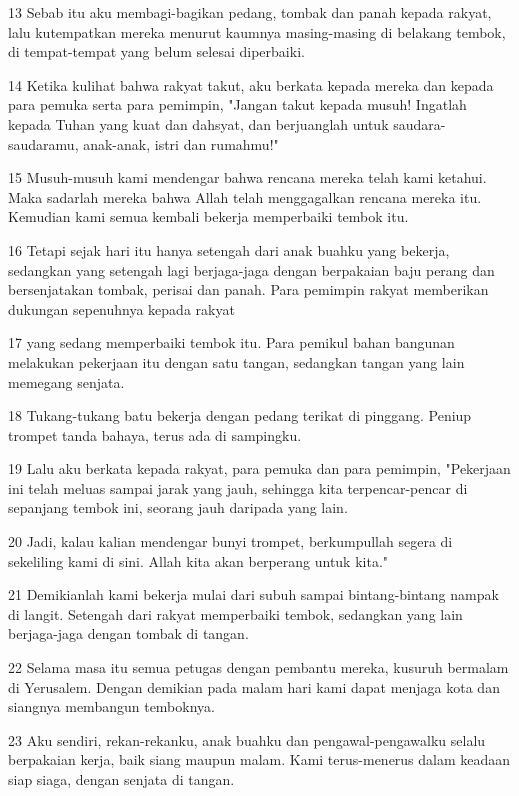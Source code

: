 \par 13 Sebab itu aku membagi-bagikan pedang, tombak dan panah kepada rakyat, lalu kutempatkan mereka menurut kaumnya masing-masing di belakang tembok, di tempat-tempat yang belum selesai diperbaiki.
\par 14 Ketika kulihat bahwa rakyat takut, aku berkata kepada mereka dan kepada para pemuka serta para pemimpin, "Jangan takut kepada musuh! Ingatlah kepada Tuhan yang kuat dan dahsyat, dan berjuanglah untuk saudara-saudaramu, anak-anak, istri dan rumahmu!"
\par 15 Musuh-musuh kami mendengar bahwa rencana mereka telah kami ketahui. Maka sadarlah mereka bahwa Allah telah menggagalkan rencana mereka itu. Kemudian kami semua kembali bekerja memperbaiki tembok itu.
\par 16 Tetapi sejak hari itu hanya setengah dari anak buahku yang bekerja, sedangkan yang setengah lagi berjaga-jaga dengan berpakaian baju perang dan bersenjatakan tombak, perisai dan panah. Para pemimpin rakyat memberikan dukungan sepenuhnya kepada rakyat
\par 17 yang sedang memperbaiki tembok itu. Para pemikul bahan bangunan melakukan pekerjaan itu dengan satu tangan, sedangkan tangan yang lain memegang senjata.
\par 18 Tukang-tukang batu bekerja dengan pedang terikat di pinggang. Peniup trompet tanda bahaya, terus ada di sampingku.
\par 19 Lalu aku berkata kepada rakyat, para pemuka dan para pemimpin, "Pekerjaan ini telah meluas sampai jarak yang jauh, sehingga kita terpencar-pencar di sepanjang tembok ini, seorang jauh daripada yang lain.
\par 20 Jadi, kalau kalian mendengar bunyi trompet, berkumpullah segera di sekeliling kami di sini. Allah kita akan berperang untuk kita."
\par 21 Demikianlah kami bekerja mulai dari subuh sampai bintang-bintang nampak di langit. Setengah dari rakyat memperbaiki tembok, sedangkan yang lain berjaga-jaga dengan tombak di tangan.
\par 22 Selama masa itu semua petugas dengan pembantu mereka, kusuruh bermalam di Yerusalem. Dengan demikian pada malam hari kami dapat menjaga kota dan siangnya membangun temboknya.
\par 23 Aku sendiri, rekan-rekanku, anak buahku dan pengawal-pengawalku selalu berpakaian kerja, baik siang maupun malam. Kami terus-menerus dalam keadaan siap siaga, dengan senjata di tangan.

